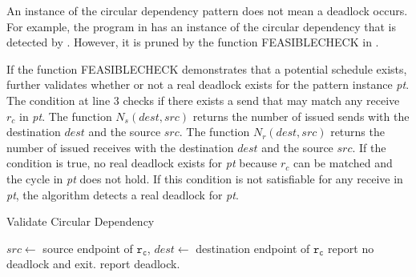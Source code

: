 \examplefigfour

An instance of the circular dependency pattern does not mean a deadlock occurs. For example, the program in  has an instance of the circular dependency that is detected by . However, it is pruned by the function \textrm{FEASIBLECHECK} in .


If the function \textrm{FEASIBLECHECK} demonstrates that a potential schedule exists,  further validates whether or not a real deadlock exists for the pattern instance \textit{pt}. The condition at line 3 checks if there exists a send that may match any receive $\mathit{r_c}$ in \textit{pt}. The function $\mathit{N_s}(\mathit{dest},\mathit{src})$ returns the number of issued sends with the destination $\mathit{dest}$ and the source $\mathit{src}$. The function $\mathit{N_r}(\mathit{dest},\mathit{src})$ returns the number of issued receives with the destination $\mathit{dest}$ and the source $\mathit{src}$.
If the condition is true, no real deadlock exists for \textit{pt} because $\mathit{r_c}$ can be matched and the cycle in \textit{pt} does not hold. If this condition is not satisfiable for any receive in \textit{pt}, the algorithm detects a real deadlock for \textit{pt}.

\begin{algorithm}
\caption{Validate Circular Dependency}\label{algo:vcircular}
\begin{algorithmic}[1]
\State $\mathit{src} \gets$ source endpoint of $\mathtt{r_c}$, $\mathit{dest} \gets$ destination endpoint of $\mathtt{r_c}$
\State report no deadlock and exit.
\EndIf
\EndFor
\State report deadlock.
\end{algorithmic}
\end{algorithm}



